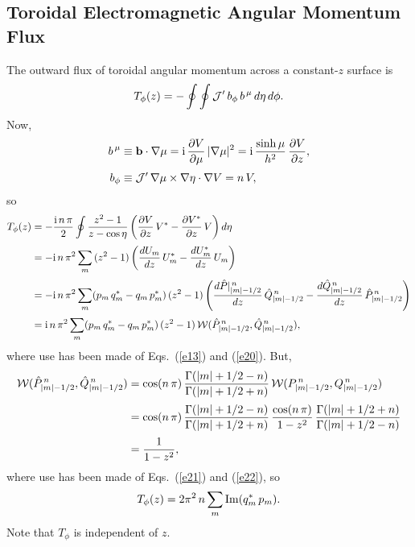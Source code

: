 \documentclass[12pt,prb,aps,notitlepage]{revtex4-1}
\begin{document}
\subsection{Toroidal Electromagnetic Angular Momentum Flux}
The outward flux of toroidal angular momentum across a constant-$z$ surface is
\begin{align}
T_\phi(z) = -\oint\oint {\cal J}' \,b_\phi\,b^{\,\mu}\,d\eta\,d\phi.
\end{align}
Now,
\begin{align}
b^{\,\mu} &\equiv {\bf b}\cdot\nabla\mu = {\rm i}\,\frac{\partial V}{\partial \mu}\,|\nabla\mu|^2 = {\rm i}\,\frac{\sinh\mu}{h^2}\,\frac{\partial V}{\partial z},\\[0.5ex]
b_{\phi}&\equiv {\cal J}'\,\nabla\mu\times\nabla \eta\cdot\nabla V = n\,V,
\end{align}
so
\begin{align}
T_\phi(z) &= -\frac{{\rm i}\,n\,\pi}{2}\oint \frac{z^2-1}{z-\cos\eta}\left(\frac{\partial V}{\partial z}\,V^\ast -\frac{\partial V^{\ast}}{\partial z}\,V\right)d\eta\nonumber\\[0.5ex]
&= - {\rm i}\,n\,\pi^2\sum_{m}\, (z^2-1)\left(\frac{dU_m}{dz}\,U_{m}^\ast -\frac{dU_m^\ast}{dz}\,U_{m}\right)\nonumber\\[0.5ex]
&= -{\rm i}\,n\,\pi^2\sum_{m}(p_m\,q_m^\ast-q_m\,p_m^{\ast})\,(z^2-1)\left(\frac{d\hat{P}|_{|m|-1/2}^{\,n}}{dz}\,\hat{Q}_{|m|-1/2}^{\,n}- \frac{d\hat{Q}_{|m|-1/2}^{\,n}}{dz}\,\hat{P}_{|m|-1/2}^{\,n}\right)\nonumber\\[0.5ex]
& ={\rm i}\,n\,\pi^2\sum_{m}(p_m\,q_m^\ast-q_m\,p_m^{\ast})\,(z^2-1)\,{\cal W}(\hat{P}_{|m|-1/2}^{\,n},\hat{Q}_{|m|-1/2}^{\,n}),
\end{align}
where use has been made of Eqs.~(\ref{e13}) and (\ref{e20}). 
But,
\begin{align}
{\cal W}(\hat{P}_{|m|-1/2}^{\,n},\hat{Q}_{|m|-1/2}^{\,n})&= 
\cos(n\,\pi) \,\frac{\Gamma(|m|+1/2-n)}{\Gamma(|m|+1/2+n)}\,{\cal W}(P_{|m|-1/2}^{\,n},Q_{|m|-1/2}^{\,n})\nonumber\\[0.5ex]
&= \cos(n\,\pi) \,\frac{\Gamma(|m|+1/2-n)}{\Gamma(|m|+1/2+n)}
\,\frac{\cos(n\,\pi)}{1-z^2}\,\frac{\Gamma(|m|+1/2+n)}{\Gamma(|m|+1/2-n)}\nonumber\\[0.5ex]
&= \frac{1}{1-z^2}, 
\end{align}
where use has been made of Eqs.~(\ref{e21}) and (\ref{e22}), 
so
\begin{equation}\label{e30}
T_\phi(z) = 2\pi^2\,n\sum_m {\rm Im}(q_m^\ast\,p_m).
\end{equation}
Note that $T_\phi$ is independent of $z$. 
\end{document}
